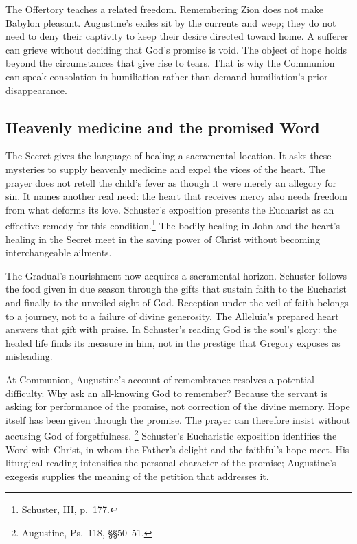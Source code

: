 The Offertory teaches a related freedom. Remembering Zion does not make
Babylon pleasant. Augustine's exiles sit by the currents and weep; they
do not need to deny their captivity to keep their desire directed toward
home. A sufferer can grieve without deciding that God's promise is void.
The object of hope holds beyond the circumstances that give rise to tears.
That is why the Communion can speak consolation in humiliation rather
than demand humiliation's prior disappearance.

\subsection{Heavenly medicine and the promised Word}
The Secret gives the language of healing a sacramental location. It asks
these mysteries to supply heavenly medicine and expel the vices of the
heart. The prayer does not retell the child's fever as though it were
merely an allegory for sin. It names another real need: the heart that
receives mercy also needs freedom from what deforms its love. Schuster's
exposition presents the Eucharist as an effective remedy for this
condition.\footnote{Schuster, III, p.~177.}
The bodily healing in John and the heart's healing in the Secret meet in
the saving power of Christ without becoming interchangeable ailments.

The Gradual's nourishment now acquires a sacramental horizon. Schuster
follows the food given in due season through the gifts that sustain faith
to the Eucharist and finally to the unveiled sight of God. Reception under
the veil of faith belongs to a journey, not to a failure of divine generosity.
The Alleluia's prepared heart answers that gift with praise. In Schuster's
reading God is the soul's glory: the healed life finds its measure in him,
not in the prestige that Gregory exposes as misleading.

At Communion, Augustine's account of remembrance resolves a potential
difficulty. Why ask an all-knowing God to remember? Because the servant
is asking for performance of the promise, not correction of the divine
memory. Hope itself has been given through the promise. The prayer can
therefore insist without accusing God of forgetfulness.
\footnote{Augustine, Ps.~118, \S\S50--51.}
Schuster's Eucharistic exposition identifies the Word with Christ, in
whom the Father's delight and the faithful's hope meet. His liturgical
reading intensifies the personal character of the promise; Augustine's
exegesis supplies the meaning of the petition that addresses it.


